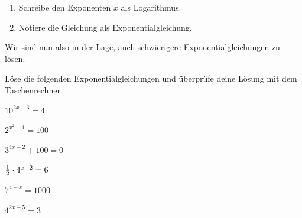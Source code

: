 \documentclass[11pt,oneside]{article}
\begin{document}
	\begin{aufgabe}
		\begin{enumerate}
			\item Schreibe den Exponenten $x$ als Logarithmus.
			\item Notiere die Gleichung als Exponentialgleichung.
		\end{enumerate}
	\end{aufgabe}
	Wir sind nun also in der Lage, auch schwierigere Exponentialgleichungen zu lösen.
	\begin{aufgabe}
		Löse die folgenden Exponentialgleichungen und überprüfe deine Lösung mit dem Taschenrechner.
		\begin{enumcols}[2]
				\item $10^{2x-3}=4$ \item $2^{x^2-1}=100$ \item $3^{4x-2}+100=0$ \item $\frac{1}{2}\cdot4^{x-2}=6$
				\item $7^{4-x}=1000$ \item $4^{2x-5}=3$
		\end{enumcols}
	\end{aufgabe}
	\newpage
\end{document}
